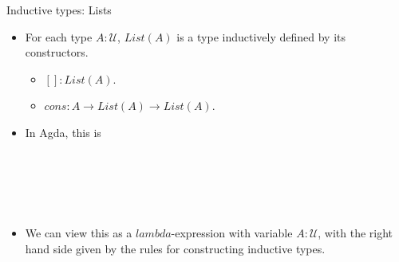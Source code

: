 \documentclass[10 pt., handout]{beamer}
\theoremstyle{plain}
\theoremstyle{remark}
\newcommand{\U}{\mathcal{U}}
\begin{document}
\begin{frame}{Inductive types: Lists}

\begin{itemize}

\item For each type $A : \U$, $List(A)$ is a type inductively defined by its constructors.
\begin{itemize}
\item $[] : List(A)$.
\item $cons : A \to List(A) \to List(A)$.
\end{itemize}

\item In Agda, this is

\begin{code}\>\<%
\\
\> \AgdaSymbol{(} \AgdaSymbol{:} \AgdaSymbol{)} \AgdaSymbol{:}  \<%
\\
\>[0]\<[2]%
\>[2]\AgdaInductiveConstructor{[]} \AgdaSymbol{:}  \<%
\\
\>[0]\<[2]%
\>[2]\AgdaInductiveConstructor{\_::\_} \AgdaSymbol{:}        \<%
\\
\>\<\end{code}

\item We can view this as a $lambda$-expression with variable $A : \U$, with the right hand side given by the rules for constructing inductive types.

\end{itemize}

\end{frame}
\end{document}
